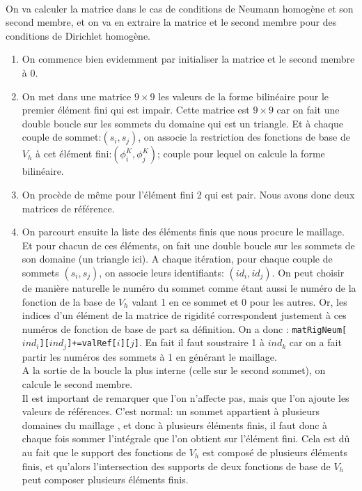 \paragraph{} On va calculer la matrice dans le cas de conditions de Neumann homogène et son second membre, et on va en extraire la matrice et le second membre pour des conditions de Dirichlet homogène.\\
\begin{enumerate}
\item On commence bien evidemment par initialiser la matrice et le second membre à 0.\\
\item On met dans une matrice $9\times9$ les valeurs de la forme bilinéaire pour le premier élément fini qui est impair. Cette matrice est $9\times 9$ car on fait une double boucle sur les sommets du domaine qui est un triangle. Et à chaque couple de sommet:$(s_i,s_j)$, on associe la restriction des fonctions de base de $V_h$ à cet élément fini:$(\phi _i^K,\phi _j^K)$; couple pour lequel on calcule la forme bilinéaire.\\
\item On procède de même pour l'élément fini 2 qui est pair. Nous avons donc deux matrices de référence.
\item On parcourt ensuite la liste des éléments finis que nous procure le maillage. Et pour chacun de ces éléments, on fait une double boucle sur les sommets de son domaine (un triangle ici). A chaque itération, pour chaque couple de sommets $(s_i,s_j)$, on associe leurs identifiants: $(id_i,id_j)$. On peut choisir de manière naturelle le numéro du sommet comme étant aussi le numéro de la fonction de la base de $V_h$ valant 1 en ce sommet  et 0 pour les autres. Or, les indices d'un élément de la matrice de rigidité correspondent justement à ces numéros de fonction de base de part sa définition. On a donc : \texttt{matRigNeum[$ind_i$][$ind_j$]+=valRef[$i$][$j$]}. En fait il faut soustraire 1 à $ind_k$ car on a fait partir les numéros des sommets à 1 en générant le maillage.\\
 A la sortie de la boucle la plus interne (celle sur le second sommet), on calcule le second membre. \\
Il est important de remarquer que l'on n'affecte pas, mais que l'on ajoute les valeurs de références. C'est normal: un sommet appartient à plusieurs domaines du maillage , et donc à plusieurs éléments finis, il faut donc à chaque fois sommer l'intégrale que l'on obtient sur l'élément fini. Cela est dû au fait que le support des fonctions de $V_h$ est composé de plusieurs éléments finis, et qu'alors l'intersection des supports de deux fonctions de base de $V_h$ peut composer plusieurs éléments finis.

\end{enumerate}
